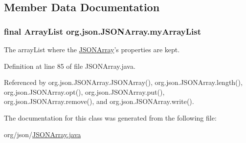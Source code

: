\subsection{Member Data Documentation}
\hypertarget{classorg_1_1json_1_1_j_s_o_n_array_a0ae87624145bd5bec5fca66d37a5e794}{
\subsubsection[{my\-Array\-List}]{\setlength{\rightskip}{0pt plus 5cm}final Array\-List org.\-json.\-J\-S\-O\-N\-Array.\-my\-Array\-List\hspace{0.3cm}{\ttfamily [private]}}}\label{classorg_1_1json_1_1_j_s_o_n_array_a0ae87624145bd5bec5fca66d37a5e794}
The array\-List where the \hyperlink{classorg_1_1json_1_1_j_s_o_n_array}{J\-S\-O\-N\-Array}'s properties are kept. 

Definition at line 85 of file J\-S\-O\-N\-Array.\-java.



Referenced by org.\-json.\-J\-S\-O\-N\-Array.\-J\-S\-O\-N\-Array(), org.\-json.\-J\-S\-O\-N\-Array.\-length(), org.\-json.\-J\-S\-O\-N\-Array.\-opt(), org.\-json.\-J\-S\-O\-N\-Array.\-put(), org.\-json.\-J\-S\-O\-N\-Array.\-remove(), and org.\-json.\-J\-S\-O\-N\-Array.\-write().



The documentation for this class was generated from the following file\-:\begin{DoxyCompactItemize}
\item 
org/json/\hyperlink{_j_s_o_n_array_8java}{J\-S\-O\-N\-Array.\-java}\end{DoxyCompactItemize}
